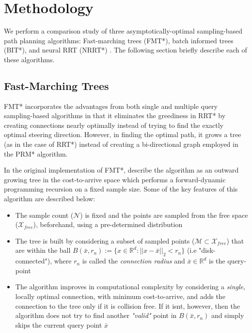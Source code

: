 \documentclass{article}
\begin{document}

\section{Methodology}
\label{sec:Methodology}
We perform a comparison study of three asymptotically-optimal sampling-based path planning algorithms: Fast-marching trees (FMT*), batch informed trees (BIT*), and neural RRT (NRRT*) \cite{nrrt}. The following section briefly describe each of these algorithms.

\subsection{Fast-Marching Trees}
\label{met:fmt}
FMT* incorporates the advantages from both single and multiple query sampling-based algorithms in that it eliminates the greediness in RRT* by creating connections nearly optimally instead of trying to find the exactly optimal steering direction. However, in finding the optimal path, it grows a tree (as in the case of RRT*) instead of creating a bi-directional graph employed in the PRM* algorithm.

In the original implementation of FMT*, \citet{FMT} describe the algorithm as an outward growing tree in the cost-to-arrive space which performs a forward-dynamic programming recursion on a fixed sample size. Some of the key features of this algorithm are described below:
\begin{itemize}
	\item The sample count ($\mathcal{N}$) is fixed and the points are sampled from the free space ($\mathcal{X}_{free}$), beforehand, using a pre-determined distribution
	\item The tree is built by considering a subset of sampled points ($\mathcal{M} \subset \mathcal{X}_{free}$) that are within the ball $B(\bar{x}, r_n) := \{ x \in \mathbb{R}^d: ||x - \bar{x}||_2 < r_n \}$  (i.e "disk-connected"), where $r_n$ is called the \textit{connection radius} and $\bar{x} \in \mathbb{R}^d$ is the query-point
	\item The algorithm improves in computational complexity by considering a \textit{single}, locally optimal connection, with minimum cost-to-arrive, and adds the connection to the tree only if it is collision free. If it isnt, however, then the algorithm does not try to find another \textit{"valid"} point in $B(\bar{x}, r_n)$ and simply skips the current query point $\bar{x}$
\end{itemize}
\end{document}
